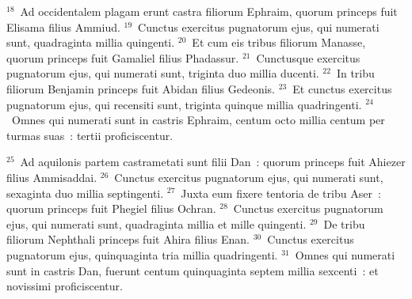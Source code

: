 ${}^{18}$~Ad occidentalem plagam erunt castra filiorum Ephraim, quorum princeps fuit Elisama filius Ammiud.
${}^{19}$~Cunctus exercitus pugnatorum ejus, qui numerati sunt, quadraginta millia quingenti.
${}^{20}$~Et cum eis tribus filiorum Manasse, quorum princeps fuit Gamaliel filius Phadassur.
${}^{21}$~Cunctusque exercitus pugnatorum ejus, qui numerati sunt, triginta duo millia ducenti.
${}^{22}$~In tribu filiorum Benjamin princeps fuit Abidan filius Gedeonis.
${}^{23}$~Et cunctus exercitus pugnatorum ejus, qui recensiti sunt, triginta quinque millia quadringenti.
${}^{24}$~Omnes qui numerati sunt in castris Ephraim, centum octo millia centum per turmas suas~: tertii proficiscentur.


${}^{25}$~Ad aquilonis partem castrametati sunt filii Dan~: quorum princeps fuit Ahiezer filius Ammisaddai.
${}^{26}$~Cunctus exercitus pugnatorum ejus, qui numerati sunt, sexaginta duo millia septingenti.
${}^{27}$~Juxta eum fixere tentoria de tribu Aser~: quorum princeps fuit Phegiel filius Ochran.
${}^{28}$~Cunctus exercitus pugnatorum ejus, qui numerati sunt, quadraginta millia et mille quingenti.
${}^{29}$~De tribu filiorum Nephthali princeps fuit Ahira filius Enan.
${}^{30}$~Cunctus exercitus pugnatorum ejus, quinquaginta tria millia quadringenti.
${}^{31}$~Omnes qui numerati sunt in castris Dan, fuerunt centum quinquaginta septem millia sexcenti~: et novissimi proficiscentur.


